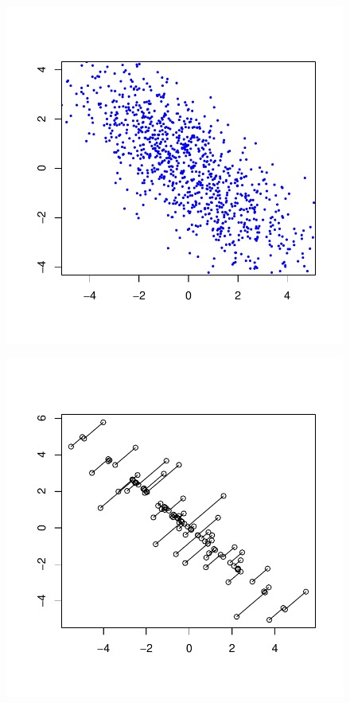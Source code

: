 \documentclass{article}
\begin{document}
\begin{figure}
	\centering
	\includegraphics[scale=\sscale]{vscatter}
	\caption{}
	\label{fig:vscatter}
\end{figure}
\begin{figure}
	\centering
	\includegraphics[scale=\sscale]{proj}
	\caption{}
	\label{fig:proj}
\end{figure}
\end{document}
